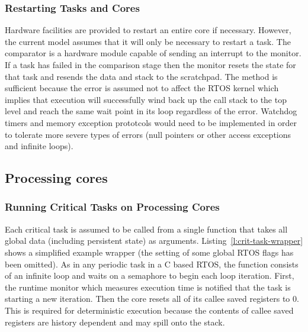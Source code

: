 \subsubsection{Restarting Tasks and Cores}

	Hardware facilities are provided to restart an entire core if necessary. 
	However, the current model assumes that it will only be necessary to restart a task.
	The comparator is a hardware module capable of sending an interrupt to the monitor. 
	If a task has failed in the comparison stage then the monitor resets the state for that task and resends the data and stack to the scratchpad.
	The method is sufficient because the error is assumed not to affect the RTOS kernel which implies that execution will successfully wind back up the call stack to the top level and reach the same wait point in its loop regardless of the error.
	Watchdog timers and memory exception prototcols would need to be implemented in order to tolerate more severe types of errors (null pointers or other access exceptions and infinite loops).



\subsection{Processing cores}
\label{s:proc-cores}
\subsubsection{Running Critical Tasks on Processing Cores}

	Each critical task is assumed to be called from a single function that takes all global data (including persistent state) as arguments. 
	Listing~\ref{l:crit-task-wrapper} shows a simplified example wrapper (the setting of some global RTOS flags has been omitted). 
	As in any periodic task in a C based RTOS, the function consists of an infinite loop and waits on a semaphore to begin each loop iteration. 
	First, the runtime monitor which measures execution time is notified that the task is starting a new iteration. 
	Then the core resets all of its callee saved registers to 0. 
	This is required for deterministic execution because the contents of callee saved registers are history dependent and may spill onto the stack. 

